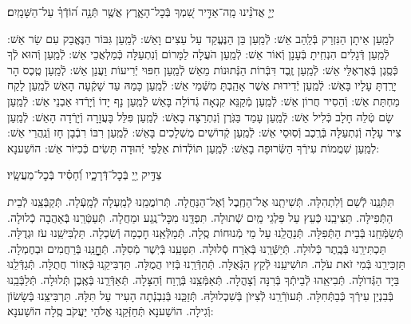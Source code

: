 \documentclass[twoside, openany, parskip=half, 11pt]{book}
\begin{document}
יְיָ֤ אֲדֹנֵ֗ינוּ מָֽה־אַדִּ֣יר שִׁ֭מְךָ בְּֿכׇל־הָאָ֑רֶץ אֲשֶׁ֥ר תְּֿנָ֥ה ה֝וֹדְֿךָ֗ עַל־הַשָּׁמָֽיִם׃


לְמַֽעַן אֵיתָן הַנִּזְרַק בְּֿלַֽהַב אֵשׁ: לְֿמַֽעַן בֵּן הַנֶּעֱקַד עַל עֵצִים וָאֵשׁ: לְֿמַֽעַן גִּבּוֹר הַנֶּאֱבַק עִם שַׂר אֵשׁ: לְֿמַֽעַן דְּֿגָלִים הִנְחִֽיתָ בְּֿעָנָן וְֿאוֹר אֵשׁ: לְֿמַֽעַן הֹעֲלָה לַמָּרוֹם וְֿנִתְעַלָּה כְּֿמַלְאֲכֵי אֵשׁ: לְֿמַֽעַן וְֿהוּא לְֿךָ כְּֿסֶֽגֶן בְּֿאֶרְאֶלֵּי אֵשׁ: לְֿמַֽעַן זֶֽבֶד דִּבְּֿרוֹת הַנְּֿתוּנוֹת מֵאֵשׁ לְֿמַֽעַן חִפּוּי יְֿרִיעוֹת וַעֲנַן אֵשׁ: לְֿמַֽעַן טֶֽכֶס הָר יָרַֽדְתָּ עָלָיו בָּאֵשׁ: לְֿמַֽעַן יְֿדִידוּת אֲשֶׁר אָהַֽבְתָּ מִשְּֿׁמֵי אֵשׁ: לְֿמַֽעַן כָּמַהּ עַד שָׁקְֿעָה הָאֵשׁ לְֿמַֽעַן לָקַח מַחְתַּת אֵשׁ: וְֿהֵסִיר חֲרוֹן אֵשׁ: לְֿמַֽעַן מְֿקַנֵּא קִנְאָה גְֿדוֹלָה בָּאֵשׁ לְֿמַֽעַן נָף יָדוֹ וְֿיָרְֿדוּ אַבְנֵי אֵשׁ: לְֿמַֽעַן שָׂם טְֿלֵה חָלָב כְּֿלִיל אֵשׁ: לְֿמַֽעַן עָמַד בַּגֹּֽרֶן וְֿנִתְרַצָּה בָאֵשׁ: לְֿמַֽעַן פִּלֵּל בָּעֲזָרָה וְֿיָרְֿדָה הָאֵשׁ: לְֿמַֽעַן צִיר עָלָה וְֿנִתְעַלָּה בְּֿרֶֽכֶב וְֿסֽוּסֵי אֵשׁ: לְֿמַֽעַן קְֿדוֹשִׁים מֻשְׁלָכִים בָּאֵשׁ: לְֿמַֽעַן רִבּוֹ רִבְֿבָן חָז וְֿנַֽהֲרֵי אֵשׁ:
לְמַֽעַן שִׁמֲמוֹת עִירְֿךָ הַשְּֿׂרוּפָה בָאֵשׁ:
לְֿמַֽעַן תּוֹלְֿדוֹת אַלֻּפֵי יְֿהוּדָה תָּשִׂים כְּֿכִיּוֹר אֵשׁ: הוֹשַׁענָא:

צַדִּ֣יק יְ֖יָ בְּֿכׇל־דְּֿרָכָ֑יו וְֿ֝חָסִ֗יד בְּֿכׇל־מַעֲשָֽׂיו׃

תִּתְּֿנֵֽנוּ לְֿשֵׁם וְֿלִתְהִלָּה.
תְּֿשִׁיתֵֽנוּ אֶל־הַחֶֽבֶל וְֿאֶל־הַנַּחֲלָה.
תְּֿרוֹמֲמֵֽנוּ לְֿמַֽעְלָה לְֿמָֽעְֿלָה.
תְּֿקַבְּֿצֵֽנוּ לְֿבֵית הַתְּֿפִילָּה.
תַּצִּיבֵֽנוּ כְּֿעֵץ עַל פַּלְגֵי מַֽיִם שְֿׁתוּלָה.
תִּפְדֵּֽנוּ מִכׇּל־נֶֽגַע וּמַחֲלָה.
תְּֿעַטְּֿרֵֽנוּ בְּֿאַהֲבָה כְֿלוּלָה.
תְּֿשַׂמְּֿחֵֽנוּ בְּֿבֵית הַתְּֿפִלָּה.
תְּֿנַהֲלֵֽנוּ עַל מֵי מְֿנוּחוֹת סֶֽלָה.
תְּֿמַלְּֿאֵֽנוּ חׇכְמָה וְֿשִׂכְלָה.
תַּלְבִּישֵֽׁנוּ עֹז וּגְדֻלָּה.
תַּכְתִּירֵֽנוּ בְּֿכֶֽתֶר כְּֿלוּלָה.
תְּֿיַשְּֿׁרֵֽנוּ בְּֿאֹֽרַח סְֿלוּלָה.
תִּטָּעֵֽנוּ בְּֿיֹֽשֶׁר מְֿסִלָּה.
תְּֿחׇׇׇׇׇׇׇׇָנֵּֽנוּ בְּֿרַחֲמִים וּבְחֶמְלָה.
תַּזְכִּירֵֽנוּ בְּֿמִי זֹאת עֹלָה.
תּוׂשִׁיעֵֽנוּ לְֿקֵץ הַגְּֿאֻלָּה.
תְּֿהַדְּֿרֵֽנוּ בְּֿזִיו הֲמֻלָּה.
תַּדְבִּיקֵֽנוּ כְּֿאֵזוֹר חֲתֻלָּה.
תְּֿגַדְּֿלֵֽנוּ בַּיָד הַגְּֿדוׂלָה.
תְּֿבִיאֵֽהוּ לְֿבֵיתְֿךָ בְּֿרִנָּה וְֿצָהֳלָה.
תְּֿאַמְּֿצֵֽנוּ בְּֿרֶֽוַח וְֿהַצָּלָה.
תְּֿאַדְּֿרְֵנוּ בְּֿאֶֽבֶן תְּֿלוּלָה.
תְּֿלַבְּֿבֵֽנוּ בְּֿבִנְיַן עִירְֿךָ כְּֿבַתְּֿחִלָּה.
תְּֿעוׂרְֿרֵֽנוּ לְֿצִיּוׂן בְּֿשִׁכְלוּלָהּ.
תְּֿזַכְֵּנוּ בְּֿנִבְנְֿתָה הָעִיר עַל תִּלָּהּ.
תַּרְבִּיצֵֽנוּ בְּֿשָׂשׂוֹן וְֿגִילָה.
הוֹשַׁענָא תְּֿחַזְּֿקֵֽנוּ אֱלֹהֵי יַעֲקֹב סֶֽלָה הוֹשַׁענָא:
\end{document}
